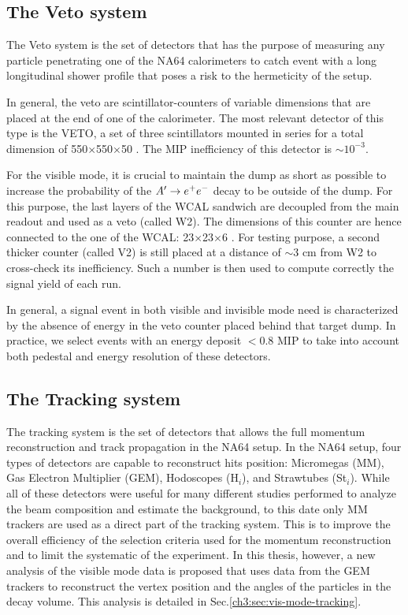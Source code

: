 \subsection{The Veto system}
\label{ch2:sec:detectors-veto}

The Veto system is the set of detectors that has the purpose of measuring any particle penetrating one of the NA64 calorimeters to catch event with a long longitudinal shower profile that poses a risk to the hermeticity of the setup.

In general, the veto are scintillator-counters of variable dimensions that are placed at the end of one of the calorimeter. The most relevant detector of this type is the VETO, a set of three scintillators mounted in series for a total dimension of 550$\times$550$\times$50 \mmc. The MIP inefficiency of this detector is $\sim 10^{-3}$.

For the visible mode, it is crucial to maintain the dump as short as possible to increase the probability of the $A' \to e^+e^-$ decay to be outside of the dump. For this purpose, the last layers of the WCAL sandwich are decoupled from the main readout and used as a veto (called W2). The dimensions of this counter are hence connected to the one of the WCAL: 23$\times$23$\times$6 \mmc. For testing purpose, a second thicker counter (called V2) is still placed at a distance of $\sim3$ \si{cm} from W2 to cross-check its inefficiency. Such a number is then used to compute correctly the signal yield of each run.

In general, a signal event in both visible and invisible mode need is characterized by the absence of energy in the veto counter placed behind that target dump. In practice, we select events with an energy deposit $<$0.8 MIP to take into account both pedestal and energy resolution of these detectors.

\subsection{The Tracking system}
\label{ch2:sec:detectors-tracking}

The tracking system is the set of detectors that allows the full momentum reconstruction and track propagation in the NA64 setup. In the NA64 setup, four types of detectors are capable to reconstruct hits position: Micromegas (MM), Gas Electron Multiplier (GEM), Hodoscopes (H$_i$), and Strawtubes (St$_i$). While all of these detectors were useful for many different studies performed to analyze the beam composition and estimate the background, to this date only MM trackers are used as a direct part of the tracking system. This is to improve the overall efficiency of the selection criteria used for the momentum reconstruction and to limit the systematic of the experiment. In this thesis, however, a new analysis of the visible mode data is proposed that uses data from the GEM trackers to reconstruct the vertex position and the angles of the particles in the decay volume. This analysis is detailed in Sec.\ref{ch3:sec:vis-mode-tracking}.

